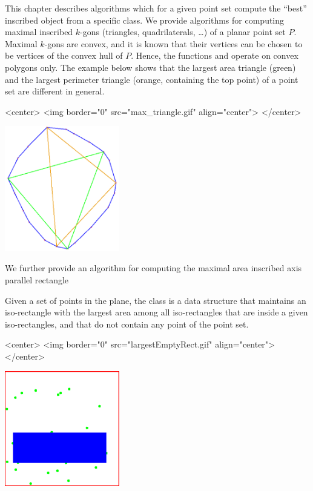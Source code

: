 
This chapter describes algorithms which for a given point set compute
the ``best'' inscribed object from a specific
class. We provide algorithms for
computing maximal inscribed $k$-gons (triangles, quadrilaterals,
\dots) of a planar point set $P$. Maximal $k$-gons are convex, and it
is known that their vertices can be chosen to be vertices of the
convex hull of $P$. Hence, the functions
 and
 operate on convex polygons
only. The example below shows that the largest area triangle (green)
and the largest perimeter triangle (orange, containing the top point)
of a point set are different in general.

\begin{ccHtmlOnly}
<center>
<img border="0" src="max_triangle.gif" align="center">
</center>
\end{ccHtmlOnly} 

\begin{ccTexOnly}
\begin{center}
\includegraphics[width=5cm]{Inscribed_areas/max_triangle}
\end{center}
\end{ccTexOnly}


We further provide an algorithm for computing the maximal area
inscribed axis parallel rectangle 

Given a set of points in the plane, the class 
is a data structure that maintains an iso-rectangle with the largest area among
all iso-rectangles that are inside a given iso-rectangles, and
that do not contain any point of the point set.

\begin{ccHtmlOnly}
<center>
<img border="0" src="largestEmptyRect.gif" align="center">
</center>
\end{ccHtmlOnly} 

\begin{ccTexOnly}
\begin{center}
\includegraphics[width=5cm]{Inscribed_areas/largestEmptyRect}
\end{center}
\end{ccTexOnly}


